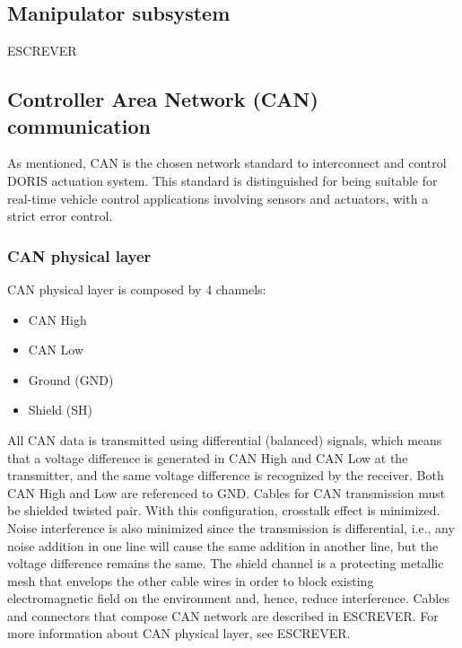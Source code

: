 \subsection{Manipulator subsystem}
ESCREVER

\subsection{Controller Area Network (CAN) communication} \label{CANDESCRIPTION}
As mentioned, CAN is the chosen network standard to interconnect and control DORIS actuation system. This standard is distinguished for being suitable for real-time vehicle control applications involving sensors and actuators, with a strict error control.
\subsubsection{CAN physical layer}
CAN physical layer is composed by 4 channels:
\begin{itemize}
  \item CAN High
  \item CAN Low
  \item Ground (GND)
  \item Shield (SH)
\end{itemize}
All CAN data is transmitted using differential (balanced) signals, which means that a voltage difference is generated in CAN High and CAN Low at the transmitter, and the same voltage difference is recognized by the receiver. Both CAN High and Low are referenced to GND. Cables for CAN transmission must be shielded twisted pair. With this configuration, crosstalk effect is minimized. Noise interference is also minimized since the transmission is differential, i.e., any noise addition in one line will cause the same addition in another line, but the voltage difference remains the same. The shield channel is a protecting metallic mesh that envelops the other cable wires in order to block existing electromagnetic field on the environment and, hence, reduce interference.
\newline
Cables and connectors that compose CAN network are described in ESCREVER. For more information about CAN physical layer, see ESCREVER.
